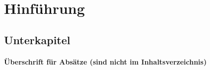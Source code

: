 
\section{Hinführung}
\kant[1-2] 
\kant[3]
\kant[4-5]
\subsection{Unterkapitel}
\kant[6]
\paragraph{Überschrift für Absätze (sind nicht im Inhaltsverzeichnis)}
\kant[7]
